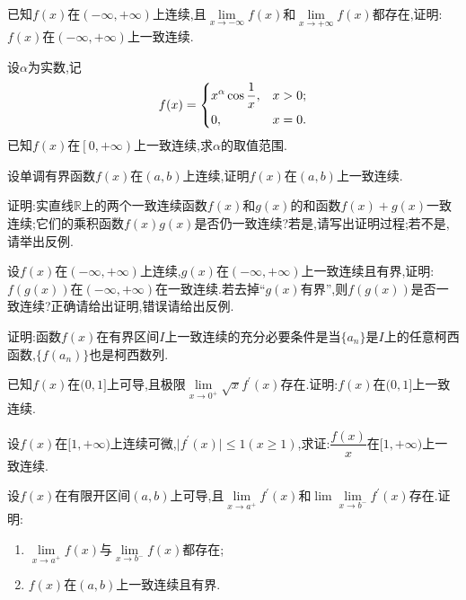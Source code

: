 \documentclass[UTF8,a4paper]{ctexart}
\begin{document}
\begin{example}[陕西师范大学,2023]
	已知$ f(x) $在$ (-\infty,+\infty) $上连续,且$ \lim\limits_{x\to -\infty}f(x) $和$ \lim\limits_{x\to +\infty}f(x) $都存在,证明:$ f(x) $在$ (-\infty,+\infty) $上一致连续.
\end{example}
\newpage
\begin{thinking}[南开大学,2023]
	设$ \alpha $为实数,记
	\[ f(x)=
	\begin{dcases}
		x^{\alpha}\cos \dfrac{1}{x}, &x>0;\\
		0, &x=0.
	\end{dcases}
\]
已知$ f(x) $在$ \left [0,+\infty\right ) $上一致连续,求$ \alpha $的取值范围.
\end{thinking}
\begin{thinking}[中国矿业大学(徐州),2023]
	设单调有界函数$ f(x) $在$ (a,b) $上连续,证明$ f(x) $在$ (a,b) $上一致连续.
\end{thinking}
\newpage
\begin{example}
	证明:实直线$ \mathbb{R} $上的两个一致连续函数$ f(x) $和$ g(x) $的和函数$ f(x)+g(x) $一致连续;它们的乘积函数$ f(x)g(x) $是否仍一致连续?若是,请写出证明过程;若不是,请举出反例.
\end{example}
\begin{example}[哈尔滨工业大学,2023]
	设$ f(x) $在$ (-\infty,+\infty) $上连续,$ g(x) $在$ (-\infty,+\infty) $上一致连续且有界,证明:$ f(g(x)) $在$ (-\infty,+\infty) $在一致连续.若去掉“$ g(x) $有界”,则$ f(g(x)) $是否一致连续?正确请给出证明,错误请给出反例.
\end{example}
\newpage
\begin{thinking}[重庆大学,2023]
	证明:函数$ f(x) $在有界区间$ I $上一致连续的充分必要条件是当$ \{a_n\} $是$ I $上的任意柯西函数,$ \{f(a_n)\} $也是柯西数列.
\end{thinking}
\newpage
\begin{example}
	已知$ f(x) $在$ (0,1] $上可导,且极限$ \lim\limits_{x\to 0^+} \sqrt{x}f^{\prime}(x)$存在.证明:$ f(x) $在$ (0,1]$上一致连续.
\end{example}
\begin{example}[大连理工大学,2023]
	设$ f(x) $在$ [1,+\infty)$上连续可微,$\lvert f^{\prime}(x) \rvert \leq 1(x\geq 1) $,求证:$ \dfrac{f(x)}{x} $在$ [1,+\infty)$上一致连续.
\end{example}
\newpage
\begin{thinking}[太原理工大学,2023]
	设$ f(x) $在有限开区间$ (a,b) $上可导,且$ \lim\limits_{x\to a^+}f^{\prime}(x) $和$ \lim\lim\limits_{x\to b^-}f^{\prime}(x) $存在.证明:
	\begin{enumerate}
		\item  $ \lim\limits_{x\to a^+}f(x) $与$ \lim\limits_{x\to b^-}f(x) $都存在;
		\item  $ f(x) $在$ (a,b) $上一致连续且有界.
	\end{enumerate}
\end{thinking}
\end{document}
